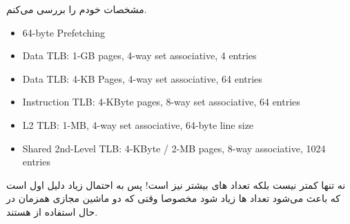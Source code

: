 مشخصات
خودم را بررسی می‌کنم.
\begin{latin}
    \begin{itemize}
        \item 64-byte Prefetching
        \item Data TLB: 1-GB pages, 4-way set associative, 4 entries
        \item Data TLB: 4-KB Pages, 4-way set associative, 64 entries
        \item Instruction TLB: 4-KByte pages, 8-way set associative, 64 entries
        \item L2 TLB: 1-MB, 4-way set associative, 64-byte line size
        \item Shared 2nd-Level TLB: 4-KByte / 2-MB pages, 8-way associative, 1024 entries
    \end{itemize}
\end{latin}
نه تنها کمتر نیست بلکه تعداد
های
بیشتر نیز است! پس به احتمال زیاد دلیل اول است که باعث می‌شود تعداد
ها زیاد شود مخصوصا وقتی که دو ماشین مجازی همزمان در حال استفاده از
هستند.